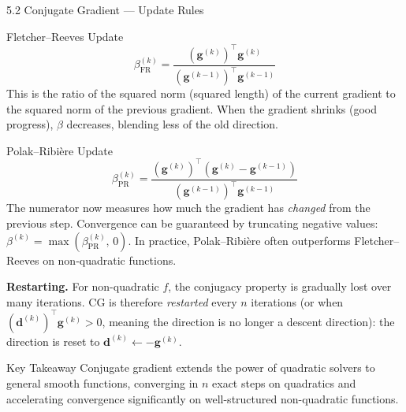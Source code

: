 \documentclass[aspectratio=169,10pt]{beamer}
\newcommand{\vg}{\mathbf{g}}
\newcommand{\vd}{\mathbf{d}}
\begin{document}
\begin{frame}[allowframebreaks]{5.2 Conjugate Gradient --- Update Rules}
  \begin{block}{Fletcher--Reeves Update}
    \[
      \beta^{(k)}_{\mathrm{FR}}
      = \frac{(\vg^{(k)})^\top \vg^{(k)}}
             {(\vg^{(k-1)})^\top \vg^{(k-1)}}
    \]
    This is the ratio of the squared norm (squared length) of
    the current gradient to the squared norm of the previous
    gradient.  When the gradient shrinks (good progress),
    $\beta$ decreases, blending less of the old direction.
  \end{block}

  \begin{block}{Polak--Ribi\`{e}re Update}
    \[
      \beta^{(k)}_{\mathrm{PR}}
      = \frac{(\vg^{(k)})^\top\!\left(\vg^{(k)}-\vg^{(k-1)}\right)}
             {(\vg^{(k-1)})^\top \vg^{(k-1)}}
    \]
    The numerator now measures how much the gradient has
    \emph{changed} from the previous step.  Convergence can
    be guaranteed by truncating negative values:
    $\beta^{(k)} = \max(\beta^{(k)}_{\mathrm{PR}},\, 0)$.
    In practice, Polak--Ribi\`{e}re often outperforms
    Fletcher--Reeves on non-quadratic functions.
  \end{block}

  \textbf{Restarting.}  For non-quadratic $f$, the conjugacy
  property is gradually lost over many iterations.  CG is
  therefore \emph{restarted} every $n$ iterations (or when
  $(\vd^{(k)})^\top \vg^{(k)} > 0$, meaning the direction
  is no longer a descent direction): the direction is reset
  to $\vd^{(k)} \leftarrow -\vg^{(k)}$.

  \begin{alertblock}{Key Takeaway}
    Conjugate gradient extends the power of quadratic solvers to
    general smooth functions, converging in $n$ exact steps on
    quadratics and accelerating convergence significantly on
    well-structured non-quadratic functions.
  \end{alertblock}

\end{frame}
\end{document}
